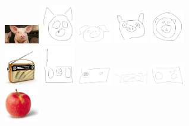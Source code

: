 \documentclass{article}
\begin{document}
\begin{figure}[H]
\centering
\includegraphics[width=1.5cm]{images/pig.jpg}
\includegraphics[width=1.5cm]{images/pig00008.png}
\includegraphics[width=1.5cm]{images/pig00039.png}
\includegraphics[width=1.5cm]{images/pig00161.png}
\includegraphics[width=1.5cm]{images/pig00295.png}\\
\includegraphics[width=1.5cm]{images/radio.jpg}
\includegraphics[width=1.5cm]{images/radio00008.png}
\includegraphics[width=1.5cm]{images/radio00111.png}
\includegraphics[width=1.5cm]{images/radio00161.png}
\includegraphics[width=1.5cm]{images/radio00286.png}\\
\includegraphics[width=1.5cm]{images/apple01.jpg}

\end{figure}
\end{document}

